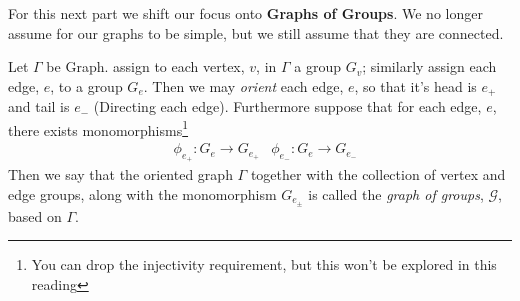 For this next part we shift our focus onto \textbf{Graphs of Groups}. We no longer assume for our graphs to be simple, but we still assume that they are connected.
\begin{definition}
    Let $\Gamma$ be Graph. assign to each vertex, $v$, in $\Gamma$ a group $G_v$; similarly assign each edge, $e$, to a group $G_e$. Then we may \textit{orient} each edge, $e$, so that it's head is $e_+$ and tail is $e_-$ (Directing each edge). Furthermore suppose that for each edge, $e$, there exists monomorphisms\footnote{You can drop the injectivity requirement, but this won't be explored in this reading}
    \begin{align*}
        &\phi_{e_+} :G_e \to G_{e_+} &\phi_{e_-} :G_e \to G_{e_-}
    \end{align*}
    Then we say that the oriented graph $\Gamma$ together with the collection of vertex and edge groups, along with the monomorphism $G_{e_\pm}$ is called the \textit{graph of groups}, $\mathcal{G}$, based on $\Gamma$.
\end{definition}
